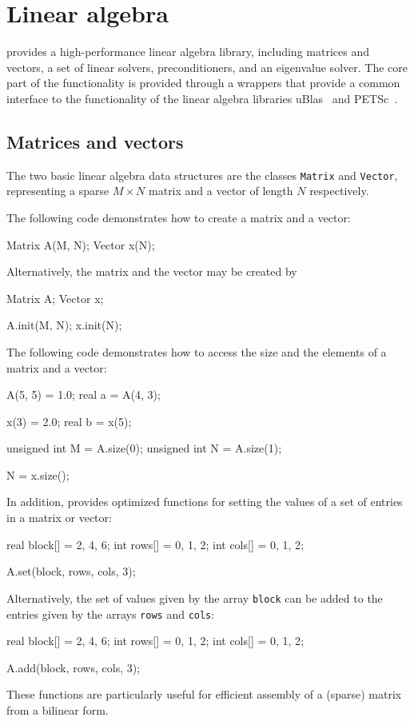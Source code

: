 \chapter{Linear algebra}


\dolfin{} provides a high-performance linear algebra library,
including matrices and vectors, a set of linear solvers,
preconditioners, and an eigenvalue solver. The core part of the
functionality is provided through a wrappers that provide a common
interface to the functionality of the linear algebra libraries
uBlas~\cite{www:ublas} and PETSc~\cite{www:petsc}.

\section{Matrices and vectors}

The two basic linear algebra data structures are the classes
\texttt{Matrix} and \texttt{Vector}, representing a sparse $M\times
N$ matrix and a vector of length $N$ respectively.

The following code demonstrates how to create a matrix and a vector:
\begin{code}
Matrix A(M, N);
Vector x(N);
\end{code}
Alternatively, the matrix and the vector may be created by
\begin{code}
Matrix A;
Vector x;

A.init(M, N);
x.init(N);
\end{code}

The following code demonstrates how to access the size and the
elements of a matrix and a vector:
\begin{code}
A(5, 5) = 1.0;
real a = A(4, 3);

x(3) = 2.0;
real b = x(5);

unsigned int M = A.size(0);
unsigned int N = A.size(1);

N = x.size();
\end{code}

In addition, \dolfin{} provides optimized functions for setting the
values of a set of entries in a matrix or vector:
\begin{code}
real block[] = {2, 4, 6};
int rows[] = {0, 1, 2};
int cols[] = {0, 1, 2};
  
A.set(block, rows, cols, 3);
\end{code}
Alternatively, the set of values given by the array \texttt{block} can
be added to the entries given by the arrays \texttt{rows} and
\texttt{cols}:
\begin{code}
real block[] = {2, 4, 6};
int rows[] = {0, 1, 2};
int cols[] = {0, 1, 2};
  
A.add(block, rows, cols, 3);
\end{code}
These functions are particularly useful for efficient assembly of a (sparse)
matrix from a bilinear form.

